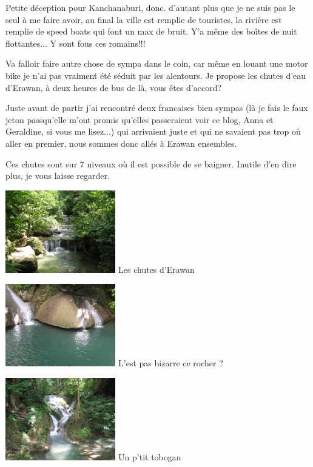 \begin{multicols}{2}
Petite déception pour Kanchanaburi, donc. d'autant plus que je ne suis pas le seul à me faire avoir, au final la ville est remplie de touristes, la rivière est remplie de speed boats qui font un max de bruit. Y'a même des boîtes de nuit flottantes... Y sont fous ces romains!!!

Va falloir faire autre chose de sympa dans le coin, car même en louant une motor bike je n'ai pas vraiment été séduit par les alentours. Je propose les chutes d'eau d'Erawan, à deux heures de bus de là, vous êtes d'accord?

Juste avant de partir j'ai rencontré deux francaises bien sympas (là je fais le faux jeton passqu'elle m'ont promis qu'elles passeraient voir ce blog, Anna et Geraldine, si vous me lisez...) qui arrivaient juste et qui ne savaient pas trop où aller en premier, nous sommes donc allés à Erawan ensembles.

Ces chutes sont sur 7 niveaux où il est possible de se baigner. Inutile d'en dire plus, je vous laisse regarder.

\hspace*{-0.65cm}
\includegraphics[width=4.8cm]{articles/Kanchanaburi/1440.jpg}
Les chutes d'Erawan

\hspace*{-0.65cm}
\includegraphics[width=4.8cm]{articles/Kanchanaburi/1439.jpg}
L'est pas bizarre ce rocher ?

\hspace*{-0.65cm}
\includegraphics[width=4.8cm]{articles/Kanchanaburi/1437.jpg}
Un p'tit tobogan


\end{multicols}
